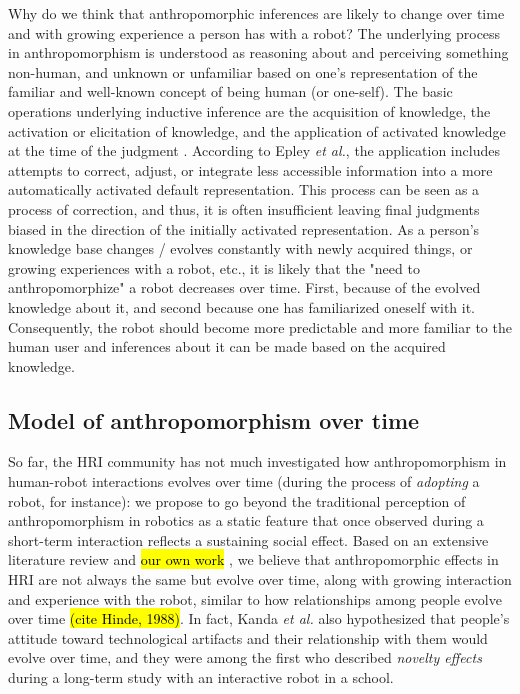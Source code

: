 \documentclass[lettersize, apacite, twoside, HRI]{apa_HRI}
\begin{document}
Why do we think that anthropomorphic inferences are likely to change over time and with growing experience a person has with a robot? The underlying process in anthropomorphism is understood as reasoning about and perceiving something non-human, and unknown or unfamiliar based on one's representation of the familiar and well-known concept of being human (or one-self). The basic operations underlying inductive inference are the acquisition of knowledge, the activation or elicitation of knowledge, and the application of activated knowledge at the time of the judgment \cite{epley_when_2008}. According to Epley \textit{et al.}, the application includes attempts to correct, adjust, or integrate less accessible information into a more automatically activated default representation. This process can be seen as a process of correction, and thus, it is often insufficient leaving final judgments biased in the direction of the initially activated representation. As a person's knowledge base changes / evolves constantly with newly acquired things, or growing experiences with a robot, etc., it is likely that the "need to anthropomorphize" a robot decreases over time. First, because of the evolved knowledge about it, and second because one has familiarized oneself with it. Consequently, the robot should become more predictable and more familiar to the human user and inferences about it can be made based on the acquired knowledge.



\subsection{Model of anthropomorphism over time}
\label{sec:modelintro}

So far, the HRI community has not much investigated how anthropomorphism in
human-robot interactions evolves over time (during the process of
\emph{adopting} a robot, for instance): we propose to go beyond the traditional
perception of anthropomorphism in robotics as a static feature that once
observed during a short-term interaction reflects a sustaining social effect.
Based on an extensive literature review \cite{fink_anthropomorphism_2012} and \hl{our own work} , we believe that anthropomorphic effects in HRI are not always the same but evolve over time, along with growing interaction
and experience with the robot, similar to how relationships among people evolve over time \hl{(cite Hinde, 1988)}. In fact, Kanda \textit{et al.} \cite{kanda_interactive_2004} also hypothesized that people's attitude toward technological artifacts and their relationship with them would evolve over time, and they were among the first who described \textit{novelty effects} during a long-term study with an interactive robot in a school.
\end{document}
